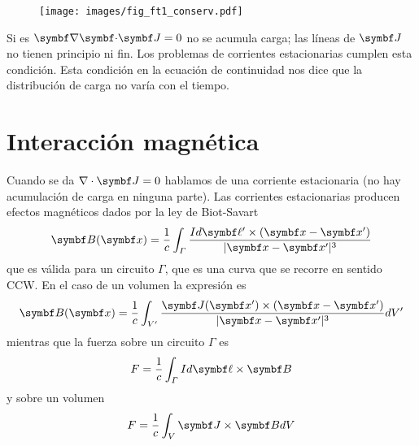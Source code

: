 \documentclass[10pt,oneside]{CBFT_book}
\begin{document}
\begin{figure}[htb]
	\begin{center}
	\texttt{[image: images/fig\_ft1\_conserv.pdf]}	 
	\end{center}
	\caption{}
	\label{conserv_carga}
\end{figure} 

Si es $\divem{J}=0$ no se acumula carga; las líneas de $\vb{J}$ no tienen principio ni fin.
Los problemas de corrientes estacionarias cumplen esta condición. Esta condición en la ecuación de continuidad
nos dice que la distribución de carga no varía con el tiempo.

\section{Interacción magnética}

Cuando se da $\nabla \cdot \vb{J}=0$ hablamos de una corriente estacionaria (no hay acumulación de carga en
ninguna parte). Las corrientes estacionarias producen efectos magnéticos dados por la ley de Biot-Savart
\[
	\vb{B}(\vb{x}) = \frac{1}{c} \int_\Gamma \frac{I d\vb{\ell}' \times (\vb{x} - \vb{x}')}{|\vb{x} - \vb{x}'|^3} 
\]
que es válida para un circuito $\Gamma$, que es una curva que se recorre en sentido CCW.
En el caso de un volumen la expresión es 
\[
	\vb{B}(\vb{x}) = \frac{1}{c} \int_{V'} \frac{ \vb{J}(\vb{x}') \times (\vb{x} - \vb{x}')}{|\vb{x} - \vb{x}'|^3} 
dV'
\]
mientras que la fuerza sobre un circuito $\Gamma$ es
\[
	F = \frac{1}{c} \int_\Gamma I d\vb{\ell} \times \vb{B}
\]
y sobre un volumen 
\[
	F = \frac{1}{c} \int_V \vb{J} \times \vb{B} dV
\]
\end{document}
